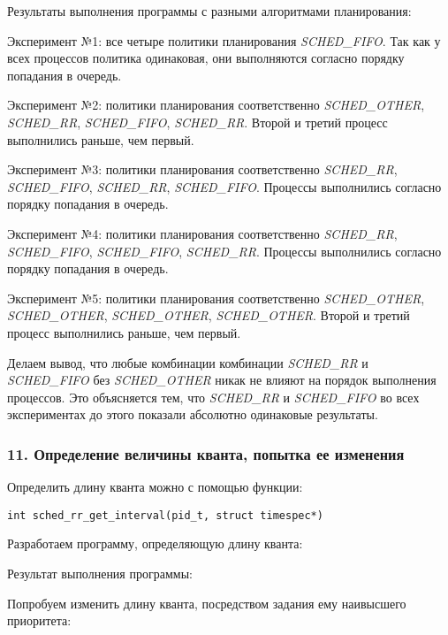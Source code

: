 \documentclass[14pt,a4paper,report]{report}
\begin{document}
Результаты выполнения программы с разными алгоритмами планирования:



Эксперимент №1: все четыре политики планирования \emph{SCHED\_FIFO}. Так как у всех процессов политика одинаковая, они выполняются согласно порядку попадания в очередь.

Эксперимент №2: политики планирования соответственно \emph{SCHED\_OTHER}, \emph{SCHED\_RR}, \emph{SCHED\_FIFO}, \emph{SCHED\_RR}. Второй и третий процесс выполнились раньше, чем первый.

Эксперимент №3: политики планирования соответственно \emph{SCHED\_RR}, \emph{SCHED\_FIFO}, \emph{SCHED\_RR}, \emph{SCHED\_FIFO}. Процессы выполнились согласно порядку попадания в очередь.

Эксперимент №4: политики планирования соответственно \emph{SCHED\_RR}, \emph{SCHED\_FIFO}, \emph{SCHED\_FIFO}, \emph{SCHED\_RR}. Процессы выполнились согласно порядку попадания в очередь.

Эксперимент №5: политики планирования соответственно \emph{SCHED\_OTHER}, \emph{SCHED\_OTHER}, \emph{SCHED\_OTHER}, \emph{SCHED\_OTHER}. Второй и третий процесс выполнились раньше, чем первый.

Делаем вывод, что любые комбинации комбинации \emph{SCHED\_RR} и \emph{SCHED\_FIFO} без \emph{SCHED\_OTHER} никак не влияют на порядок выполнения процессов. Это объясняется тем, что \emph{SCHED\_RR} и \emph{SCHED\_FIFO} во всех экспериментах до этого показали абсолютно одинаковые результаты.

\subsubsection{11. Определение величины кванта, попытка ее изменения}

Определить длину кванта можно с помощью функции:

\begin{verbatim}
int sched_rr_get_interval(pid_t, struct timespec*)
\end{verbatim}

Разработаем программу, определяющую длину кванта:



Результат выполнения программы:



Попробуем изменить длину кванта, посредством задания ему наивысшего приоритета:
\end{document}
